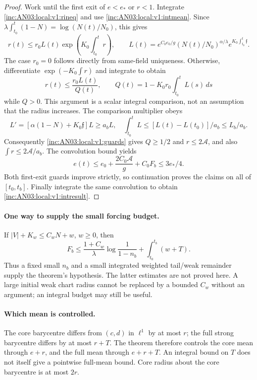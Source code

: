 \documentclass[11pt]{article}
\numberwithin{equation}{section}
\theoremstyle{remark}\newtheorem{remark}[theorem]{Remark}
\newcommand{\dd}{\,d}\newcommand{\E}{\mathbb E}
\begin{document}
\begin{proof}
Work until the first exit of $e<e_*$ or $r<1$. Integrate
\eqref{inc:AN03:local:v1:rineq} and use
\eqref{inc:AN03:local:v1:intmean}. Since
$\lambda\int_{t_0}^t(1-N)=\log(N(t)/N_0)$, this gives
\[
 r(t)\le r_0L(t)\exp\left(K_0\int_{t_0}^tr\right),\qquad
 L(t)=e^{C_0e_0/g}(N(t)/N_0)^{\alpha/\lambda}
                      e^{K_0\int_{t_0}^t\mathfrak f}.
\]
The case $r_0=0$ follows directly from same-field uniqueness. Otherwise,
differentiate $\exp(-K_0\int r)$ and integrate to obtain
\[
 r(t)\le\frac{r_0L(t)}{Q(t)},\qquad
 Q(t)=1-K_0r_0\int_{t_0}^tL(s)\dd s
\]
while $Q>0$. This argument is a scalar integral comparison, not an
assumption that the radius increases. The comparison multiplier obeys
\[
 L'=[\alpha(1-N)+K_0\mathfrak f]L\ge a_bL,
 \quad
 \int_{t_0}^tL\le[L(t)-L(t_0)]/a_b\le L_b/a_b.
\]
Consequently \eqref{inc:AN03:local:v1:guards} gives $Q\ge1/2$ and
$r\le2\mathcal A$, and also $\int r\le2\mathcal A/a_b$.
The convolution bound yields
\[
 e(t)\le e_0+\frac{2C_0\mathcal A}{g}+C_0F_b\le3e_*/4.
\]
Both first-exit guards improve strictly, so continuation proves the
claims on all of $[t_0,t_b]$. Finally integrate the same convolution to
obtain \eqref{inc:AN03:local:v1:intresult}.
\end{proof}

\paragraph{One way to supply the small forcing budget.}
If $|V|+K_w\le C_wN+w$, $w\ge0$, then
\[
 F_b\le\frac{1+C_w}{\lambda}\log\frac1{1-n_b}
                       +\int_{t_0}^{t_b}(w+T).
\]
Thus a fixed small $n_b$ and a small integrated weighted tail/weak
remainder supply the theorem's hypothesis. The latter estimates are not
proved here. A large initial weak chart radius cannot be replaced by a
bounded $C_w$ without an argument; an integral budget may still be useful.

\paragraph{Which mean is controlled.}
The core barycentre differs from $(c,d)$ in $\ell^1$ by at most $r$;
the full strong barycentre differs by at most $r+T$. The theorem therefore
controls the core mean through $e+r$, and the full mean through $e+r+T$.
An integral bound on $T$ does not itself give a pointwise full-mean bound.
Core radius about the core barycentre is at most $2r$.
\end{document}
